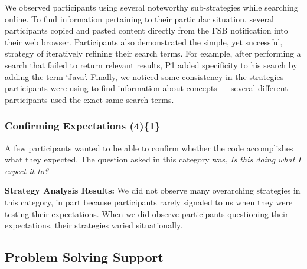 \documentclass[10pt,journal,compsoc]{IEEEtran}
\begin{document}
We observed participants using several noteworthy sub-strategies while searching online.
To find information pertaining to their particular situation, several participants copied and pasted content directly from the FSB notification into their web browser.
Participants also demonstrated the simple, yet successful, strategy of iteratively refining their search terms. 
For example, after performing a search that failed to return relevant results, P1 added specificity to his search by adding the term `Java'.
Finally, we noticed some consistency in the strategies participants were using to find information about concepts --- several different participants used the exact same search terms. 






\subsubsection{Confirming Expectations (4)\{1\}}

\label{ce}

A few participants wanted to be able to confirm whether the code accomplishes what they expected. 
The question asked in this category was, \textit{Is this doing what I expect it to?} 


\textbf{Strategy Analysis Results:}
We did not observe many overarching strategies in this category, in part because participants rarely signaled to us when they were testing their expectations. 
When we did observe participants questioning their expectations, their strategies varied situationally.


\subsection{Problem Solving Support}
\label{sec:results-pss}
\end{document}
